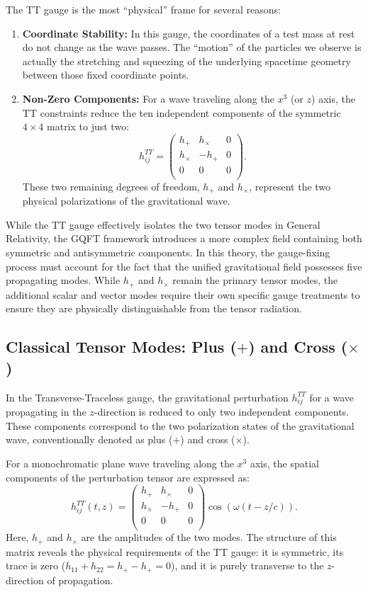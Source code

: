 The TT gauge is the most ``physical'' frame for several reasons:
\begin{enumerate}
  \item \textbf{Coordinate Stability:} In this gauge, the coordinates of a test mass at rest do not change as the wave passes. The ``motion'' of the particles we observe is actually the stretching and squeezing of the underlying spacetime geometry between those fixed coordinate points.
  \item \textbf{Non-Zero Components:} For a wave traveling along the $x^3$ (or $z$) axis, the TT constraints reduce the ten independent components of the symmetric $4 \times 4$ matrix to just two:
    \[%
      h_{ij}^{TT} = \begin{pmatrix}
        h_+ & h_\times & 0 \\
        h_\times & -h_+ & 0 \\
        0 & 0 & 0 \\
      \end{pmatrix}
    .\]%
    These two remaining degrees of freedom, $h_+$ and $h_\times$, represent the two physical polarizations of the gravitational wave.
\end{enumerate}

While the TT gauge effectively isolates the two tensor modes in General Relativity, the GQFT framework introduces a more complex field containing both symmetric and antisymmetric components. In this theory, the gauge-fixing process must account for the fact that the unified gravitational field possesses five propagating modes. While $h_+$ and $h_\times$ remain the primary tensor modes, the additional scalar and vector modes require their own specific gauge treatments to ensure they are physically distinguishable from the tensor radiation.

\subsection{Classical Tensor Modes: Plus ($+$) and Cross ($\times$)} In the Transverse-Traceless gauge, the gravitational perturbation $h_{ij}^{TT}$ for a wave propagating in the $z$-direction is reduced to only two independent components. These components correspond to the two polarization states of the gravitational wave, conventionally denoted as plus ($+$) and cross ($\times$).

For a monochromatic plane wave traveling along the $x^3$ axis, the spatial components of the perturbation tensor are expressed as:
\[%
  h_{ij}^{TT}(t, z) = \begin{pmatrix}
    h_+ & h_\times & 0 \\
    h_\times & -h_+ & 0 \\
    0 & 0 & 0 \\
  \end{pmatrix} \cos(\omega(t - z/c))
.\]%
Here, $h_+$ and $h_\times$ are the amplitudes of the two modes. The structure of this matrix reveals the physical requirements of the TT gauge: it is symmetric, its trace is zero ($h_{11} + h_{22} = h_+ - h_+ = 0$), and it is purely transverse to the $z$-direction of propagation.

